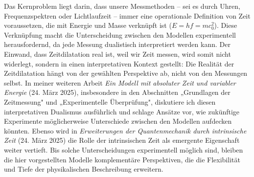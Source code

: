 \documentclass[a4paper,12pt]{article}
\begin{document}
Das Kernproblem liegt darin, dass unsere Messmethoden – sei es durch Uhren, Frequenzspektren oder Lichtlaufzeit – immer eine operationale Definition von Zeit voraussetzen, die mit Energie und Masse verknüpft ist (\( E = h f = m c_0^2 \)). Diese Verknüpfung macht die Unterscheidung zwischen den Modellen experimentell herausfordernd, da jede Messung dualistisch interpretiert werden kann. Der Einwand, dass Zeitdilatation real ist, weil wir Zeit messen, wird somit nicht widerlegt, sondern in einen interpretativen Kontext gestellt: Die Realität der Zeitdilatation hängt von der gewählten Perspektive ab, nicht von den Messungen selbst. In meiner weiteren Arbeit \textit{Ein Modell mit absoluter Zeit und variabler Energie} (24. März 2025), insbesondere in den Abschnitten „Grundlagen der Zeitmessung" und „Experimentelle Überprüfung", diskutiere ich diesen interpretativen Dualismus ausführlich und schlage Ansätze vor, wie zukünftige Experimente möglicherweise Unterschiede zwischen den Modellen aufdecken könnten. Ebenso wird in \textit{Erweiterungen der Quantenmechanik durch intrinsische Zeit} (24. März 2025) die Rolle der intrinsischen Zeit als emergente Eigenschaft weiter vertieft. Bis solche Unterscheidungen experimentell möglich sind, bleiben die hier vorgestellten Modelle komplementäre Perspektiven, die die Flexibilität und Tiefe der physikalischen Beschreibung erweitern.	
\end{document}
